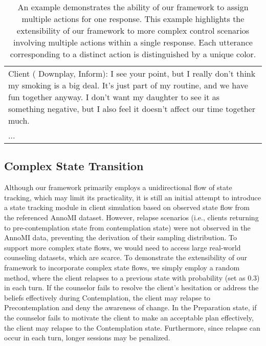 \begin{table*}[htbp]
\begin{tabularx}{\textwidth}{X}
Client ({\color{red} Downplay}, {\color{green} Inform}): {\color{red}I see your point, but I really don’t think my smoking is a big deal. It’s just part of my routine, and we have fun together anyway.} {\color{green}I don’t want my daughter to see it as something negative, but I also feel it doesn’t affect our time together much.}                                                            \\
...                                                                                                               \\ \bottomrule    
\end{tabularx}
\caption{An example demonstrates the ability of our framework to assign multiple actions for one response. This example highlights the extensibility of our framework to more complex control scenarios involving multiple actions within a single response. Each utterance corresponding to a distinct action is distinguished by a unique color.}
\label{tab:multiple actions}
\end{table*}

\subsection{Complex State Transition}

Although our framework primarily employs a unidirectional flow of state tracking, which may limit its practicality, it is still an initial attempt to introduce a state tracking module in client simulation based on observed state flow from the referenced AnnoMI dataset. However, relapse scenarios (i.e., clients returning to pre-contemplation state from contemplation state) were not observed in the AnnoMI data, preventing the derivation of their sampling distribution. To support more complex state flows, we would need to access large real-world counseling datasets, which are scarce. To demonstrate the extensibility of our framework to incorporate complex state flows, we simply employ a random method, where the client relapses to a previous state with probability (set as 0.3) in each turn. If the counselor fails to resolve the client’s hesitation or address the beliefs effectively during Contemplation, the client may relapse to Precontemplation and deny the awareness of change. In the Preparation state, if the counselor fails to motivate the client to make an acceptable plan effectively, the client may relapse to the Contemplation state. Furthermore, since relapse can occur in each turn, longer sessions may be penalized.

